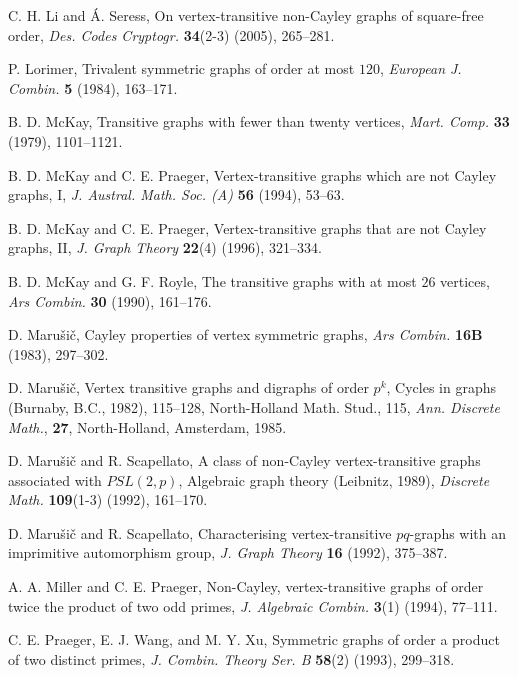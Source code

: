 \documentclass{amsart}
\begin{document}
\begin{thebibliography}{0}
C. H. Li and \'{A}. Seress, On vertex-transitive non-Cayley graphs of square-free order, \textit{Des. Codes Cryptogr.} \textbf{34}(2-3) (2005), 265--281.

P. Lorimer, Trivalent symmetric graphs of order at most $120$, \textit{European J. Combin.} \textbf{5} (1984), 163--171.

B. D. McKay, Transitive graphs with fewer than twenty vertices, \textit{Mart. Comp.} \textbf{33} (1979), 1101--1121.

B. D. McKay and C. E. Praeger, Vertex-transitive graphs which are not Cayley graphs, I, \textit{J. Austral. Math. Soc. (A)} \textbf{56} (1994), 53--63.

B. D. McKay and C. E. Praeger, Vertex-transitive graphs that are not Cayley graphs, II, \textit{J. Graph Theory} \textbf{22}(4) (1996), 321--334.

B. D. McKay and G. F. Royle, The transitive graphs with at most $26$ vertices, \textit{Ars Combin.} \textbf{30} (1990), 161--176.

D. Maru\v{s}i\v{c}, Cayley properties of vertex symmetric graphs, \textit{Ars Combin.} \textbf{16B} (1983), 297--302.

D. Maru\v{s}i\v{c}, Vertex transitive graphs and digraphs of order $p^k$, Cycles in graphs (Burnaby, B.C., 1982), 115--128, North-Holland Math. Stud., 115, \textit{Ann. Discrete Math.}, \textbf{27}, North-Holland, Amsterdam, 1985.

D. Maru\v{s}i\v{c} and R. Scapellato, A class of non-Cayley vertex-transitive graphs associated with $PSL(2,p)$, Algebraic graph theory (Leibnitz, 1989), \textit{Discrete Math.} \textbf{109}(1-3) (1992), 161--170.

D. Maru\v{s}i\v{c} and R. Scapellato, Characterising vertex-transitive $pq$-graphs with an imprimitive automorphism group, \textit{J. Graph Theory} \textbf{16} (1992), 375--387.

A. A. Miller and C. E. Praeger, Non-Cayley, vertex-transitive graphs of order twice the product of two odd primes, \textit{J. Algebraic Combin.} \textbf{3}(1) (1994), 77--111.

C. E. Praeger, E. J. Wang, and M. Y. Xu, Symmetric graphs of order a product of two distinct primes, \textit{J. Combin. Theory Ser. B} \textbf{58}(2) (1993), 299--318.


\end{thebibliography}
\end{document}
